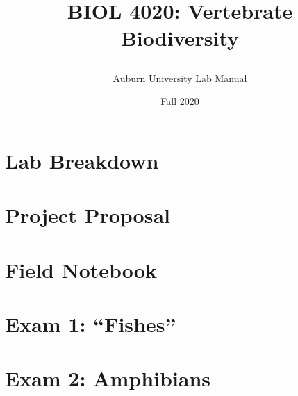 \documentclass[oneside]{book}
\title{\LARGE{BIOL 4020: Vertebrate Biodiversity}
\author{\Large{Auburn University Lab Manual}
\date{\Large{Fall 2020}}
}}
\begin{document}
\maketitle
\tableofcontents
\chapter{\Huge{Lab Breakdown}} \label{SecLabBreak}
\chapter{\Huge{Project Proposal}} \label{SecProjProp}
\chapter{\Huge{Field Notebook}} \label{SecFieldNote}
\chapter{\Huge{Exam 1: ``Fishes''}}  \label{SecFish}
\chapter{\Huge{Exam 2: Amphibians}} \label{SecAmphib}
\end{document}
